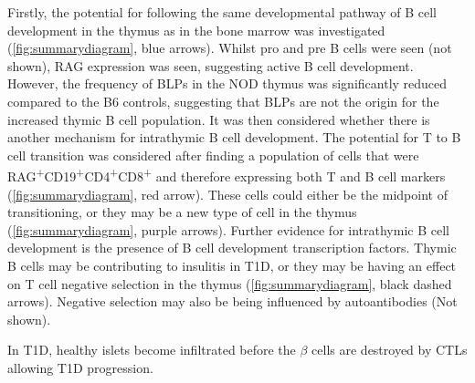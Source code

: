 Firstly, the potential for following the same developmental pathway of B cell development in the thymus as in the bone marrow was investigated (\cref{fig:summarydiagram}, blue arrows).
Whilst pro and pre B cells were seen (not shown), RAG expression was seen, suggesting active B cell development.
However, the frequency of BLPs in the NOD thymus was significantly reduced compared to the B6 controls, suggesting that BLPs are not the origin for the increased thymic B cell population.
It was then considered whether there is another mechanism for intrathymic B cell development.
The potential for T to B cell transition was considered after finding a population of cells that were RAG\textsuperscript{+}CD19\textsuperscript{+}CD4\textsuperscript{+}CD8\textsuperscript{+} and therefore expressing both T and B cell markers (\cref{fig:summarydiagram}, red arrow).
These cells could either be the midpoint of transitioning, or they may be a new type of cell in the thymus (\cref{fig:summarydiagram}, purple arrows).
Further evidence for intrathymic B cell development is the presence of B cell development transcription factors.
Thymic B cells may be contributing to insulitis in T1D, or they may be having an effect on T cell negative selection in the thymus (\cref{fig:summarydiagram}, black dashed arrows).
Negative selection may also be being influenced by autoantibodies (Not shown).

In T1D, healthy islets become infiltrated before the $\beta$ cells are destroyed by CTLs allowing T1D progression.


